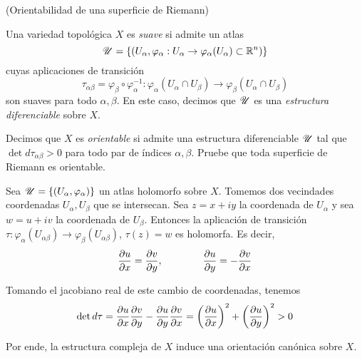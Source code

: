 \begin{exercise}
(Orientabilidad de una superficie de Riemann)

\vspace{2mm}

\noindent Una variedad topológica $X$ es \textit{suave} si admite un atlas
$$\mathscr U = \{ (U_\alpha, \varphi_\alpha : U_\alpha \to \varphi_\alpha(U_\alpha) \subset \mathbb R^n) \}$$
cuyas aplicaciones de transición
$$\tau_{\alpha \beta} = \varphi_\beta \circ \varphi_\alpha^{-1} : \varphi_\alpha(U_\alpha \cap U_\beta) \to \varphi_\beta(U_\alpha \cap U_\beta)$$
son suaves para todo $\alpha, \beta$. En este caso, decimos que $\mathscr U$ es una \textit{estructura diferenciable} sobre $X$.

Decimos que $X$ es \textit{orientable} si admite una estructura diferenciable $\mathscr U$ tal que $\det d\tau_{\alpha \beta} > 0$ para todo par de índices $\alpha, \beta$. Pruebe que toda superficie de Riemann es orientable.
\end{exercise}

\begin{solution}
Sea $\mathscr U = \{ (U_\alpha, \varphi_\alpha) \}$ un atlas holomorfo sobre $X$. Tomemos dos vecindades coordenadas $U_\alpha, U_\beta$ que se intersecan. Sea $z = x + iy$ la coordenada de $U_\alpha$ y sea $w = u + iv$ la coordenada de $U_\beta$. Entonces la aplicación de transición $\tau : \varphi_\alpha(U_{\alpha \beta}) \to \varphi_\beta(U_{\alpha \beta})$, $\tau(z) = w$ es holomorfa. Es decir,
$$\frac {\partial u} {\partial x} = \frac {\partial v} {\partial y}, \qquad \qquad \frac {\partial u} {\partial y} = -\frac {\partial v} {\partial x}$$

Tomando el jacobiano real de este cambio de coordenadas, tenemos
$$\det d\tau = \frac {\partial u} {\partial x}  \frac {\partial v} {\partial y} - \frac {\partial u} {\partial y} \frac {\partial v} {\partial x} = \left( \frac {\partial u} {\partial x} \right)^2 + \left( \frac {\partial u} {\partial y} \right)^2 > 0$$

Por ende, la estructura compleja de $X$ induce una orientación canónica sobre $X$.
\end{solution}
